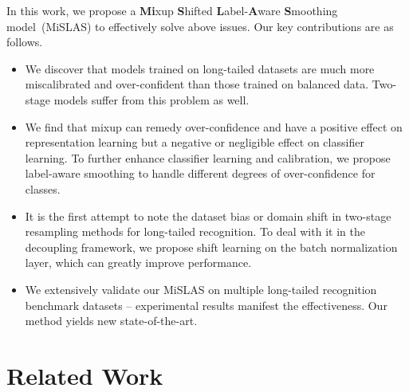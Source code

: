 \documentclass[final]{cvpr}
\begin{document}
	In this work, we propose a \textbf{Mi}xup \textbf{S}hifted \textbf{L}abel-\textbf{A}ware \textbf{S}moothing model~(MiSLAS) to effectively solve above issues. Our key contributions are as follows.
	
	\begin{itemize}[itemsep=-0.2em, leftmargin=1em]
		\item  We discover that models trained on long-tailed datasets are much more miscalibrated and over-confident than those trained on balanced data. Two-stage models suffer from this problem as well. 
		\item We find that mixup can remedy over-confidence and have a positive effect on representation learning but a negative or negligible effect on classifier learning. To further enhance classifier learning and calibration, we propose label-aware smoothing to handle different degrees of over-confidence for  classes. 
		\item It is the first attempt to note the dataset bias or domain shift in two-stage resampling methods for long-tailed recognition. To deal with it in the decoupling framework, we propose shift learning on the batch normalization layer, which can greatly improve performance. 
		\item We extensively validate our MiSLAS on multiple long-tailed recognition benchmark datasets -- experimental results manifest the effectiveness. Our method yields new state-of-the-art.
	\end{itemize}
	
	
	
	
	
	


	
	
	\section{Related Work}
	
\end{document}
